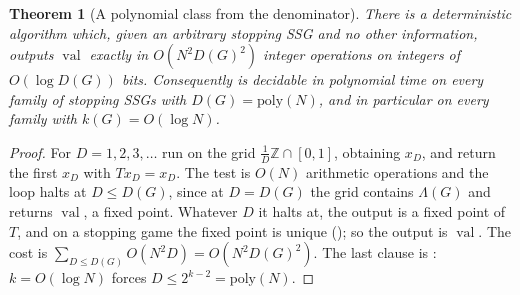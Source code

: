 \documentclass[11pt]{article}
\theoremstyle{plain}
\newtheorem{theorem}{Theorem}[section]
\theoremstyle{definition}
\DeclareMathOperator{\val}{val}
\begin{document}
\begin{theorem}[A polynomial class from the denominator]\label{thm:few-denominator}
There is a deterministic algorithm which, given an arbitrary stopping SSG
and no other information, outputs $\val$ exactly in
$O(N^{2}D(G)^{2})$ integer operations on integers of $O(\log D(G))$ bits.
Consequently  is decidable in polynomial time on every
family of stopping SSGs with $D(G)=\mathrm{poly}(N)$, and in particular
on every family with $k(G)=O(\log N)$.
\end{theorem}

\begin{proof}
For $D=1,2,3,\dots$ run  on the grid
$\tfrac1D\mathbb Z\cap[0,1]$, obtaining $x_D$, and return the first $x_D$
with $Tx_D=x_D$. The test is $O(N)$ arithmetic operations and the loop
halts at $D\le D(G)$, since at $D=D(G)$ the grid contains $\Lambda(G)$ and
 returns $\val$, a fixed point. Whatever $D$ it
halts at, the output is a fixed point of $T$, and on a stopping game the
fixed point is unique (); so the output is $\val$.
The cost is $\sum_{D\le D(G)}O(N^{2}D)=O(N^{2}D(G)^{2})$. The last clause
is : $k=O(\log N)$ forces
$D\le2^{k-2}=\mathrm{poly}(N)$.
\end{proof}
\end{document}
